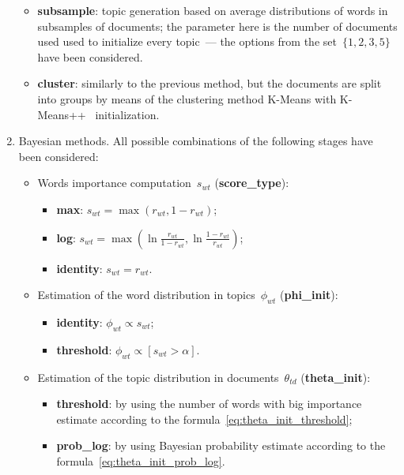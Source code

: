 \documentclass{sig-alternate-2013}
\begin{document}
\begin{enumerate}
\begin{itemize}
            \item \textbf{subsample}: topic generation based on average distributions of words in subsamples
                of documents; the parameter here is the number of documents used
                used to initialize every topic~--- the options from the set~$\{1, 2, 3, 5\}$ have been considered.
            \item \textbf{cluster}: similarly to the previous method,
            but the documents are split into groups by means
            of the clustering method K-Means with K-Means++~\cite{arthur07kmeanspp} initialization.
        \end{itemize}
    \item
    Bayesian methods. All possible combinations of the following stages have been considered:
        \begin{itemize}
            \item Words importance computation~$s_{wt}$ (\textbf{score\_type}):
                \begin{itemize}
                    \item \textbf{max}: $s_{wt} = \max(r_{wt}, 1 - r_{wt})$;
                    \item \textbf{log}: $s_{wt} =
                        \max \left(
                            \ln \frac{r_{wt}}{1 - r_{wt}},
                            \ln \frac{1 - r_{wt}}{r_{wt}}
                        \right)$;
                    \item \textbf{identity}: $s_{wt} = r_{wt}$.
                \end{itemize}
            \item Estimation of the word distribution in topics~$\phi_{wt}$ (\textbf{phi\_init}):
                \begin{itemize}
                    \item \textbf{identity}: $\phi_{wt} \propto s_{wt}$;
                    \item \textbf{threshold}: $\phi_{wt} \propto [s_{wt} > \alpha]$.
                \end{itemize}
            \item Estimation of the topic distribution in documents~$\theta_{td}$ (\textbf{theta\_init}):
                \begin{itemize}
                    \item \textbf{threshold}: by using the number of words with big importance estimate according to the formula~\eqref{eq:theta_init_threshold};
                    \item \textbf{prob\_log}: by using Bayesian probability estimate according to the formula~\eqref{eq:theta_init_prob_log}.
                \end{itemize}
        \end{itemize}
\end{enumerate}
\end{document}
